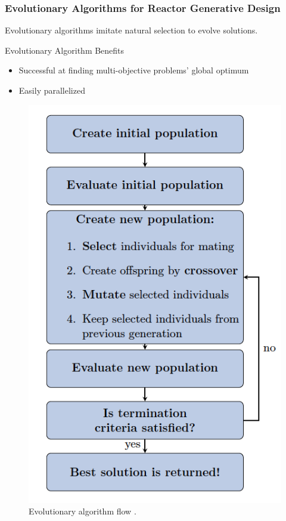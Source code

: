    \begin{frame}
    \frametitle{Evolutionary Algorithms for Reactor Generative Design}
    Evolutionary algorithms imitate natural selection to evolve solutions. 
    \begin{minipage}{0.55\textwidth}
            Evolutionary Algorithm Benefits 
            \begin{itemize}
                \item Successful at finding multi-objective problems' global optimum 
                \item Easily parallelized 
            \end{itemize}
        \end{minipage}\hfill
        \begin{minipage}[c]{0.45\textwidth}
            \begin{figure}
                \includegraphics[width=0.8\linewidth]{figures/ea-flow.png} 
                \caption{Evolutionary algorithm flow \cite{renner_genetic_2003}. }
              \end{figure}
        \end{minipage}
    \end{frame}

